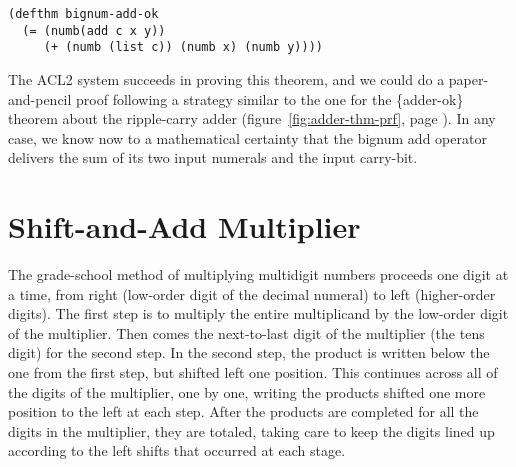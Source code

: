 \label{bignum-adder-thm}
\begin{code}
\begin{verbatim}
(defthm bignum-add-ok
  (= (numb(add c x y))
     (+ (numb (list c)) (numb x) (numb y))))
\end{verbatim}
\end{code}

The ACL2 system succeeds in proving this theorem,
and we could do a paper-and-pencil proof following a strategy
similar to the one for the \{adder-ok\} theorem about the ripple-carry adder
(figure~\ref{fig:adder-thm-prf}, page \pageref{fig:adder-thm-prf}).
In any case, we know now to a mathematical certainty
that the bignum \textsf{add} operator delivers
the sum of its two input numerals and the input carry-bit.

\begin{exercises}

\end{exercises}

\section{Shift-and-Add Multiplier}
\label{sec:bignum-mult}

The grade-school method of multiplying multidigit numbers proceeds one digit at a time,
from right (low-order digit of the decimal numeral) to left (higher-order digits).
The first step is to multiply the entire multiplicand by the low-order digit
of the multiplier.
Then comes the next-to-last digit of the multiplier (the tens digit) for the second step.
In the second step, the product is written below the one from the first step,
but shifted left one position.
This continues across all of the digits of the multiplier, one by one,
writing the products shifted one more position to the left at each step.
After the products are completed for
all the digits in the multiplier, they are totaled, taking care to keep
the digits lined up according to the left shifts that occurred at each stage.

